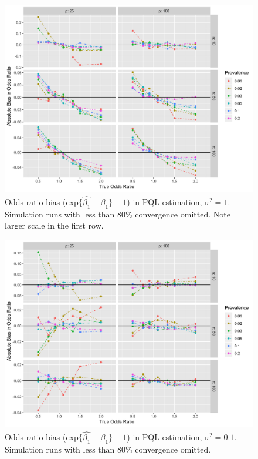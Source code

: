 \documentclass{article}
\begin{document}
\begin{flushleft}
\begin{figure}[]
\begin{center}
\includegraphics[width=\textwidth]{_bias_pql_sbs1.png}
  \caption{Odds ratio bias ($\text{exp} \{ \bar{\hat{\beta_1}} - \beta_1 \}-1$) in PQL estimation, $\sigma^2=1$. Simulation runs with less than 80\% convergence omitted. Note larger scale in the first row.}
    \label{fig:_bias_pql_6}
\end{center}
\end{figure}

\begin{figure}[]
\begin{center}
\includegraphics[width=\textwidth]{_bias_pql_sbspt1.png}
  \caption{Odds ratio bias ($\text{exp} \{ \bar{\hat{\beta_1}} - \beta_1 \} - 1$) in PQL estimation, $\sigma^2=0.1$. Simulation runs with less than 80\% convergence omitted.}
    \label{fig:_bias_pql_sbs_pt1}
\end{center}
\end{figure}


\end{flushleft}
\end{document}
